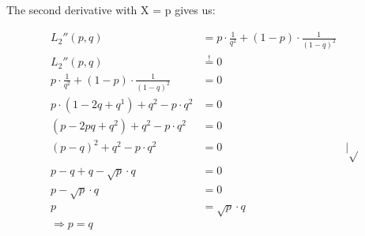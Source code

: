  The second derivative with X = p gives us:
 
 \begin{align*}
   L_2'' (p,q) &= p \cdot \frac{1}{q^2} + (1-p) \cdot \frac{1}{(1-q)^2}\\
   L_2'' (p,q) &\stackrel{!}{=} 0 \\
   p \cdot \frac{1}{q^2} + (1-p) \cdot \frac{1}{(1-q)^2} &= 0\\
   p \cdot (1 - 2q + q^1) + q^2 - p\cdot q^2 &= 0 \\
   (p - 2pq + q^2) + q^2 - p\cdot q^2 &= 0\\
   (p-q)^2 + q^2 - p\cdot q^2 &= 0 &| \sqrt{} \\
   p - q + q - \sqrt{p} \cdot q &= 0 \\
   p - \sqrt{p}\cdot q &= 0 \\
   p &= \sqrt{p}\cdot q \\
   \Rightarrow p = q 
\end{align*}

